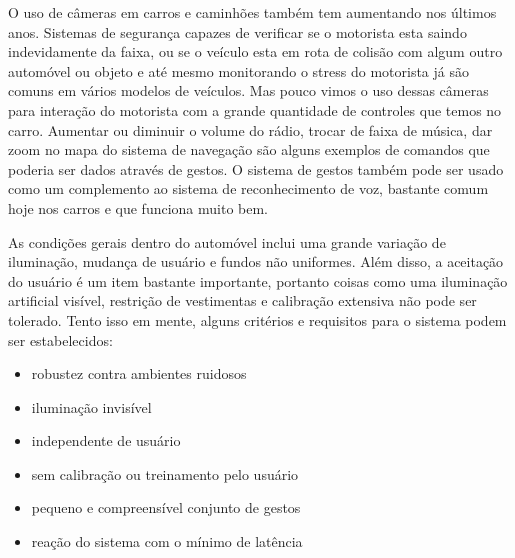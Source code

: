 O uso de câmeras em carros e caminhões também tem aumentando nos últimos anos. Sistemas de segurança capazes de verificar se o motorista esta saindo indevidamente da faixa, ou se o veículo esta em rota de colisão com algum outro automóvel ou objeto e até mesmo monitorando o stress do motorista já são comuns em vários modelos de veículos. Mas pouco vimos o uso dessas câmeras para interação do motorista com a grande quantidade de controles que temos no carro. Aumentar ou diminuir o volume do rádio, trocar de faixa de música, dar zoom no mapa do sistema de navegação são alguns exemplos de comandos que poderia ser dados através de gestos.
O sistema de gestos também pode ser usado como um complemento ao sistema de reconhecimento de voz, bastante comum hoje nos carros e que funciona muito bem.

As condições gerais dentro do automóvel inclui uma grande variação de iluminação, mudança de usuário e fundos não uniformes. Além disso, a aceitação do usuário é um item bastante importante, portanto coisas como uma iluminação artificial visível, restrição de vestimentas e calibração extensiva não pode ser tolerado. Tento isso em mente, alguns critérios e requisitos para o sistema podem ser estabelecidos:

\begin{itemize}
\item robustez contra ambientes ruidosos
\item iluminação invisível
\item independente de usuário
\item sem calibração ou treinamento pelo usuário
\item pequeno e compreensível conjunto de gestos
\item reação do sistema com o mínimo de latência
\end{itemize}


